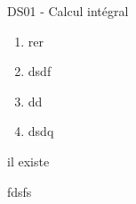 \documentclass[a4paper,12pt,openany]{book}
\begin{document}
\begin{center}\begin{huge}
DS01 - Calcul intégral
\end{huge}\end{center}

\exo 

\begin{enumerate}
	\item rer
	\item dsdf

	\item dd
	\item dsdq
\end{enumerate}
il existe 
\newpage

fdsfs
\end{document}
